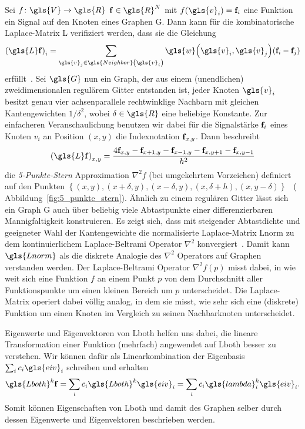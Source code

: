 Sei $f \colon \gls{V} \to \gls{R}$ \bzw{} $\ve{f} \in \gls{R}^N$ mit $f\left(\gls{v}_i\right) = \ve{f}_i$ eine Funktion \bzw{} ein Signal auf den Knoten eines Graphen \gls{G}.
Dann kann für die kombinatorische Laplace-Matrix \gls{L} verifiziert werden, dass sie die Gleichung
\begin{equation*}
  {\left(\gls{L}\ve{f}\right)}_i = \sum_{\gls{v}_j \in \gls{Neighbor}\left(\gls{v}_i\right)} \gls{w}\left(\gls{v}_i, \gls{v}_j\right) \left(\ve{f}_i - \ve{f}_j\right)
\end{equation*}
erfüllt~\cite{Hammond}.
Sei $\gls{G}$ nun ein Graph, der aus einem (unendlichen) zweidimensionalen regulärem Gitter entstanden ist, \dhe{} jeder Knoten $\gls{v}_i$ besitzt genau vier achsenparallele rechtwinklige Nachbarn mit gleichen Kantengewichten $1/\delta^2$, wobei $\delta \in \gls{R}$ eine beliebige Konstante.
Zur einfacheren Veranschaulichung benutzen wir dabei für die Signalstärke $\mathbf{f}_i$ eines Knoten $v_i$ an Position $\left(x, y\right)$ die Indexnotation $\mathbf{f}_{x,y}$.
Dann beschreibt
\begin{equation*}
  {\left(\gls{L}\ve{f}\right)}_{x,y} = \frac{4\ve{f}_{x,y} - \ve{f}_{x+1,y} - \ve{f}_{x-1,y} - \ve{f}_{x,y+1} - \ve{f}_{x,y-1}}{h^2}
\end{equation*}
die \emph{5-Punkte-Stern} Approximation $\nabla^2 f$ (bei umgekehrtem Vorzeichen) definiert auf den Punkten $\left\{\left(x,y\right), \left(x+\delta,y\right), \left(x-\delta,y\right), \left(x,\delta+h\right),\left(x,y-\delta\right)\right\}$~\cite{Hammond} (\vgl{} Abbildung~\ref{fig:5_punkte_stern}).
Ähnlich zu einem regulären Gitter lässt sich ein Graph \gls{G} auch über beliebig viele Abtastpunkte einer differenzierbaren Mannigfaltigkeit konstruieren.
Es zeigt sich, dass mit steigender Abtastdichte und geeigneter Wahl der Kantengewichte die normalisierte Laplace-Matrix \gls{Lnorm} zu dem kontinuierlichem Laplace-Beltrami Operator $\nabla^2$ konvergiert~\cite{Hammond}.
Damit kann $\gls{Lnorm}$ als die diskrete Analogie des $\nabla^2$ Operators auf Graphen verstanden werden.
Der Laplace-Beltrami Operator $\nabla^2 f\left(p\right)$ misst dabei, in wie weit sich eine Funktion $f$ an einem Punkt $p$ von dem Durchschnitt aller Funktionspunkte um einen kleinen Bereich um $p$ unterscheidet.
Die Laplace-Matrix operiert dabei völlig analog, in dem sie misst, wie sehr sich eine (diskrete) Funktion um einen Knoten im Vergleich zu seinen Nachbarknoten unterscheidet.

Eigenwerte und Eigenvektoren von \gls{Lboth} helfen uns dabei, die lineare Transformation einer Funktion  (mehrfach) angewendet auf \gls{Lboth} besser zu verstehen.
Wir können dafür  als Linearkombination der Eigenbasis $\sum_i c_i \gls{eiv}_i$ schreiben und erhalten
\begin{equation*}
  \gls{Lboth}^k \ve{f} = \sum_i c_i \gls{Lboth}^k \gls{eiv}_i = \sum_i c_i \gls{lambda}_i^k \gls{eiv}_i.
\end{equation*}
Somit können Eigenschaften von \gls{Lboth} und damit des Graphen selber durch dessen Eigenwerte und Eigenvektoren beschrieben werden.

